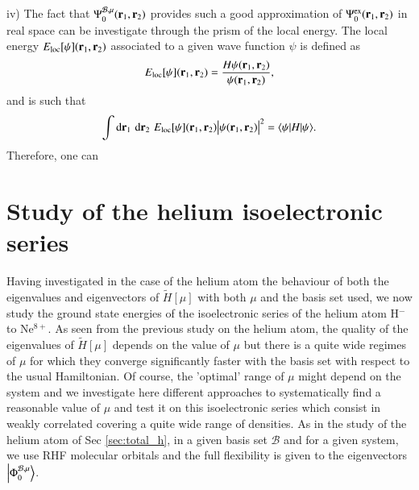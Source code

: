 \documentclass[aip,jcp,reprint,noshowkeys,superscriptaddress]{revtex4-1}
\newcommand{\matelem}[3]{\langle #1 | #2 | #3 \rangle}
\newcommand{\br}[0]{{\bf {r}}}
\newcommand{\psiex}[0]{\Psi^{\text{ex}}_0}
\newcommand{\phimub}[0]{\Phi^{\mathcal{B},\mu}_0}
\newcommand{\psimub}[0]{\Psi^{\mathcal{B},\mu}_0}
\newcommand{\basis}[0]{\mathcal{B}}
\begin{document}
iv) The fact that $\psimub(\br{}_1,\br{}_2)$ provides  such a good approximation of $\psiex(\br{}_1,\br{}_2)$ in real space can be investigate through the prism of the local energy. 
The local energy $E_{\text{loc}}[\psi](\br{}_1,\br{}_2)$ associated to a given wave function $\psi$ is defined as 
\begin{equation}
 E_{\text{loc}}[\psi](\br{}_1,\br{}_2) = \frac{H\psi(\br{}_1,\br{}_2)}{\psi(\br{}_1,\br{}_2)},
\end{equation}
and is such that 
\begin{equation}
 \int \text{d}\br{}_1\,\,\text{d}\br{}_2\,\, E_{\text{loc}}[\psi](\br{}_1,\br{}_2) \big|\psi(\br{}_1,\br{}_2)\big|^2= \matelem{\psi}{H}{\psi}.
\end{equation}
Therefore, one can 

\section{Study of the helium isoelectronic series}
\label{sec:iso_elec}
Having investigated in the case of the helium atom the behaviour of both the eigenvalues and eigenvectors of $\tilde{H}[\mu]$ with both $\mu$ and the basis set used, we now study the ground state energies of the isoelectronic series of the helium atom H$^{-}$ to Ne$^{8+}$. As seen from the previous study on the helium atom, the quality of the eigenvalues of $\tilde{H}[\mu]$ depends on the value of $\mu$ but there is a quite wide regimes of $\mu$ for which they converge significantly faster with the basis set with respect to the usual Hamiltonian. Of course, the 'optimal' range of $\mu$ might depend on the system and we investigate here different approaches to systematically find a reasonable value of $\mu$ and test it on this isoelectronic series which consist in weakly correlated covering a quite wide range of densities. 
As in the study of the helium atom of Sec \ref{sec:total_h}, in a given basis set $\basis$ and for a given system, we use RHF molecular orbitals and the full flexibility is given to the eigenvectors $\ket{\phimub}$. 
\end{document}
